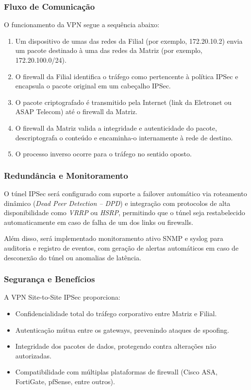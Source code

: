 \documentclass[a4paper, 12pt]{article}
\begin{document}
\subsubsection{Fluxo de Comunicação}
\label{subsubsec:vpn-flow}

O funcionamento da VPN segue a sequência abaixo:
\begin{enumerate}
    \item Um dispositivo de umas das redes da Filial (por exemplo, 172.20.10.2) envia um pacote destinado à uma das redes da Matriz (por exemplo, 172.20.100.0/24).
    \item O firewall da Filial identifica o tráfego como pertencente à política IPSec e encapsula o pacote original em um cabeçalho IPSec.
    \item O pacote criptografado é transmitido pela Internet (link da Eletronet ou ASAP Telecom) até o firewall da Matriz.
    \item O firewall da Matriz valida a integridade e autenticidade do pacote, descriptografa o conteúdo e encaminha-o internamente à rede de destino.
    \item O processo inverso ocorre para o tráfego no sentido oposto.
\end{enumerate}

\subsubsection{Redundância e Monitoramento}
\label{subsubsec:vpn-redundancy}

O túnel IPSec será configurado com suporte a failover automático via roteamento dinâmico (\textit{Dead Peer Detection – DPD}) e integração com protocolos de alta disponibilidade como \textit{VRRP} ou \textit{HSRP}, permitindo que o túnel seja restabelecido automaticamente em caso de falha de um dos links ou firewalls.

Além disso, será implementado monitoramento ativo SNMP e syslog para auditoria e registro de eventos, com geração de alertas automáticos em caso de desconexão do túnel ou anomalias de latência.

\subsubsection{Segurança e Benefícios}
\label{subsubsec:vpn-security}

A VPN Site-to-Site IPSec proporciona:
\begin{itemize}
    \item Confidencialidade total do tráfego corporativo entre Matriz e Filial.
    \item Autenticação mútua entre os gateways, prevenindo ataques de spoofing.
    \item Integridade dos pacotes de dados, protegendo contra alterações não autorizadas.
    \item Compatibilidade com múltiplas plataformas de firewall (Cisco ASA, FortiGate, pfSense, entre outros).
\end{itemize}
\end{document}
